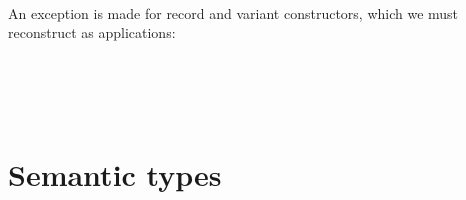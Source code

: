 \documentclass[authoryear, acmsmall, screen, review, nonacm]{acmart}
\begin{document}
\begin{code}
\AgdaSpace{}%
\AgdaSymbol{=}\AgdaSpace{}%
\AgdaSpace{}%
\AgdaSpace{}%
\AgdaSpace{}%
\<%
\\
\>[0]\AgdaSpace{}%
\AgdaSymbol{(}\AgdaSpace{}%
\AgdaSpace{}%
\AgdaSymbol{)}\AgdaSpace{}%
\AgdaSymbol{=}\AgdaSpace{}%
\AgdaSymbol{(}\AgdaSpace{}%
\AgdaSymbol{)}\AgdaSpace{}%
\AgdaSpace{}%
\AgdaSymbol{(}\AgdaSpace{}%
\AgdaSymbol{)}\<%
\end{code}

\Ni An exception is made for record and variant constructors, which we must reconstruct as applications:

\begin{code}%
\>[0]\AgdaSpace{}%
\AgdaSymbol{(}\AgdaSpace{}%
\AgdaSymbol{)}\AgdaSpace{}%
\AgdaSymbol{=}\AgdaSpace{}%
\AgdaSpace{}%
\AgdaSpace{}%
\AgdaSpace{}%
\<%
\\
\>[0]\AgdaSpace{}%
\AgdaSymbol{(}\AgdaSpace{}%
\AgdaSymbol{)}\AgdaSpace{}%
\AgdaSymbol{=}\AgdaSpace{}%
\AgdaSpace{}%
\AgdaSpace{}%
\AgdaSpace{}%
\<%
\\
\>[0]\AgdaSpace{}%
\AgdaSymbol{(}\AgdaSpace{}%
\AgdaSymbol{)}\AgdaSpace{}%
\AgdaSymbol{=}\AgdaSpace{}%
\AgdaSpace{}%
\AgdaSpace{}%
\AgdaSpace{}%
\<%
\\
\>[0]\AgdaSpace{}%
\AgdaSymbol{(}\AgdaSpace{}%
\AgdaSymbol{)}\AgdaSpace{}%
\AgdaSymbol{=}\AgdaSpace{}%
\AgdaSpace{}%
\AgdaSpace{}%
\AgdaSpace{}%
\<%
\end{code}

\section{Semantic types}
\end{document}
